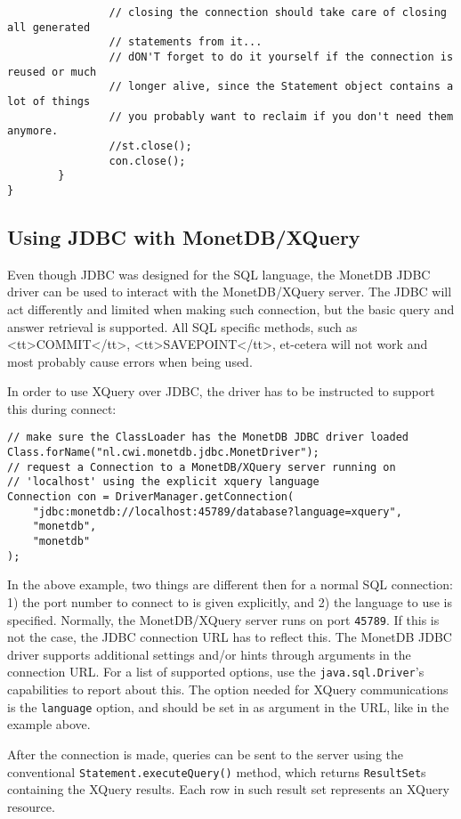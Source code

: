 \documentclass{article}
\begin{document}
\begin{verbatim}
                // closing the connection should take care of closing all generated
                // statements from it...
                // dON'T forget to do it yourself if the connection is reused or much
                // longer alive, since the Statement object contains a lot of things
                // you probably want to reclaim if you don't need them anymore.
                //st.close();
                con.close();
        }
}
\end{verbatim}

\subsection{Using JDBC with MonetDB/XQuery}
Even though JDBC was designed for the SQL language, the MonetDB JDBC
driver can be used to interact with the MonetDB/XQuery server.  The JDBC
will act differently and limited when making such connection, but the
basic query and answer retrieval is supported.  All SQL specific
methods, such as <tt>COMMIT</tt>, <tt>SAVEPOINT</tt>, et-cetera will not
work and most probably cause errors when being used.

In order to use XQuery over JDBC, the driver has to be instructed to
support this during connect:
\begin{verbatim}
// make sure the ClassLoader has the MonetDB JDBC driver loaded
Class.forName("nl.cwi.monetdb.jdbc.MonetDriver");
// request a Connection to a MonetDB/XQuery server running on
// 'localhost' using the explicit xquery language
Connection con = DriverManager.getConnection(
    "jdbc:monetdb://localhost:45789/database?language=xquery",
    "monetdb",
    "monetdb"
);
\end{verbatim}
In the above example, two things are different then for a normal SQL
connection: 1) the port number to connect to is given explicitly, and 2)
the language to use is specified.  Normally, the MonetDB/XQuery server
runs on port \texttt{45789}.  If this is not the case, the JDBC
connection URL has to reflect this.  The MonetDB JDBC driver supports
additional settings and/or hints through arguments in the connection
URL.  For a list of supported options, use the
\texttt{java.sql.Driver}'s capabilities to report about this.  The
option needed for XQuery communications is the \texttt{language} option,
and should be set in as argument in the URL, like in the example above.

After the connection is made, queries can be sent to the server using
the conventional \texttt{Statement.executeQuery()} method, which returns
\texttt{ResultSet}s containing the XQuery results.  Each row in such
result set represents an XQuery resource.
\end{document}
